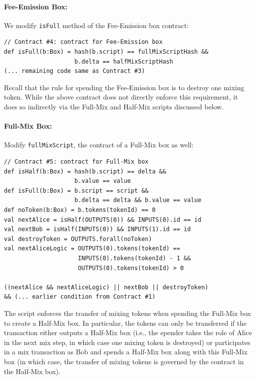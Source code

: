 \documentclass[runningheads]{llncs}
\begin{document}
\paragraph{Fee-Emission Box:}
We modify \texttt{isFull} method of the Fee-Emission box contract:

{\small
\begin{Verbatim}[frame=single]
// Contract #4: contract for Fee-Emission box
def isFull(b:Box) = hash(b.script) == fullMixScriptHash && 
                    b.delta == halfMixScriptHash
(... remaining code same as Contract #3)                    
\end{Verbatim}
}

Recall that the rule for spending the Fee-Emission box is to destroy one mixing token. While the above contract does not directly enforce this requirement, it does so indirectly via the Full-Mix and Half-Mix scripts discussed below.

\paragraph{Full-Mix Box:}

Modify \texttt{fullMixScript}, the contract of a Full-Mix box as well:

{\small
\begin{Verbatim}[frame=single]
// Contract #5: contract for Full-Mix box
def isHalf(b:Box) = hash(b.script) == delta && 
                    b.value == value
def isFull(b:Box) = b.script == script &&
                    b.delta == delta && b.value == value
def noToken(b:Box) = b.tokens(tokenId) == 0
val nextAlice = isHalf(OUTPUTS(0)) && INPUTS(0).id == id
val nextBob = isHalf(INPUTS(0)) && INPUTS(1).id == id
val destroyToken = OUTPUTS.forall(noToken)
val nextAliceLogic = OUTPUTS(0).tokens(tokenId) == 
                     INPUTS(0).tokens(tokenId) - 1 && 
                     OUTPUTS(0).tokens(tokenId) > 0

((nextAlice && nextAliceLogic) || nextBob || destroyToken) 
&& (... earlier condition from Contract #1)
\end{Verbatim}
}

The script enforces the transfer of mixing tokens when spending the Full-Mix box to create a Half-Mix box. In particular, the tokens can only be transferred if the transaction either outputs a Half-Mix box (i.e., the spender takes the role of Alice in the next mix step, in which case one mixing token is destroyed) or participates in a mix transaction as Bob and spends a Half-Mix box along with this Full-Mix box (in which case, the transfer of mixing tokens is governed by the contract in the Half-Mix box).
\end{document}
